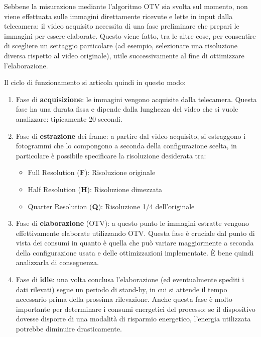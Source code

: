 Sebbene la misurazione mediante l'algoritmo OTV sia svolta sul momento, non viene effettuata sulle immagini direttamente ricevute
e lette in input dalla telecamera: il video acquisito necessita di una fase preliminare che prepari le immagini per essere elaborate.
Questo viene fatto, tra le altre cose, per consentire di scegliere un settaggio particolare (ad esempio, selezionare una 
risoluzione diversa rispetto al video originale), utile successivamente al fine di ottimizzare l'elaborazione.

Il ciclo di funzionamento si articola quindi in questo modo:
\begin{enumerate}
    \item Fase di \textbf{acquisizione}: le immagini vengono acquisite dalla telecamera. Questa fase ha una durata fissa e dipende
    dalla lunghezza del video che si vuole analizzare: tipicamente 20 secondi.
    \item Fase di \textbf{estrazione} dei frame: a partire dal video acquisito, si estraggono i fotogrammi che lo compongono a seconda
    della configurazione scelta, in particolare è possibile specificare la risoluzione desiderata tra:
    \begin{itemize}
        \item Full Resolution (\textbf{F}): Risoluzione originale
        \item Half Resolution (\textbf{H}): Risoluzione dimezzata
        \item Quarter Resolution (\textbf{Q}): Risoluzione 1/4 dell'originale
    \end{itemize}
    \item Fase di \textbf{elaborazione} (OTV): a questo punto le immagini estratte vengono effettivamente elaborate utilizzando
    OTV. Questa fase è cruciale dal punto di vista dei consumi in quanto è quella che può variare maggiormente a seconda della
    configurazione usata e delle ottimizzazioni implementate. È bene quindi analizzarla di conseguenza.
    \item Fase di \textbf{idle}: una volta conclusa l'elaborazione (ed eventualmente spediti i dati rilevati) segue un periodo di stand-by,
    in cui si attende il tempo necessario prima della prossima rilevazione. Anche questa fase è molto importante per determinare
    i consumi energetici del processo: se il dispositivo dovesse disporre di una modalità di risparmio energetico, 
    l'energia utilizzata potrebbe diminuire drasticamente.
\end{enumerate}

